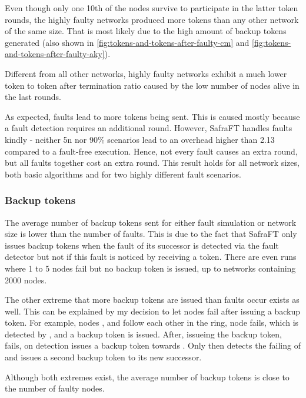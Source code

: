 Even though only one 10th of the nodes survive to participate in the latter token rounds, the highly faulty networks produced more tokens than any other network of the same size.
That is most likely due to the high amount of backup tokens generated (also shown in \cref{fig:tokens-and-tokens-after-faulty-cm} and \ref{fig:tokens-and-tokens-after-faulty-aky}).

Different from all other networks, highly faulty networks exhibit a much lower token to token after termination ratio caused by the low number of nodes alive in the last rounds.

As expected, faults lead to more tokens being sent.
This is caused mostly because a fault detection requires an additional round.
However, SafraFT handles faults kindly - neither 5n nor 90\% scenarios lead to an overhead higher than 2.13 compared to a fault-free execution.
Hence, not every fault causes an extra round, but all faults together cost an extra round.
This result holds for all network sizes, both basic algorithms and for two highly different fault scenarios.

\subsubsection{Backup tokens}
The average number of backup tokens sent for either fault simulation or network size is lower than the number of faults.
This is due to the fact that SafraFT only issues backup tokens when the fault of its successor is detected via the fault detector but not if this fault is noticed by receiving a token.
There are even runs where 1 to 5 nodes fail but no backup token is issued, up to networks containing 2000 nodes.

The other extreme that more backup tokens are issued than faults occur exists as well.
This can be explained by my decision to let nodes fail after issuing a backup token.
For example, nodes ,  and  follow each other in the ring, node  fails, which is detected by , and a backup token is issued.
After, issueing the backup token,  fails, on detection  issues a backup token towards .
Only then  detects the failing of  and issues a second backup token to its new successor.

Although both extremes exist, the average number of backup tokens is close to the number of faulty nodes.

